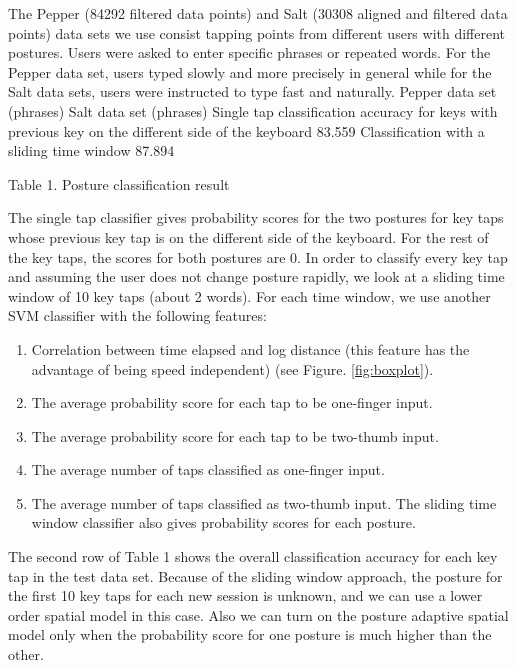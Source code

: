 \documentclass{sigchi}
\begin{document}
The Pepper (84292 filtered data points) and Salt (30308 aligned and filtered data points) data sets we use consist tapping points from different users with different postures. Users were asked to enter specific phrases or repeated words. For the Pepper data set, users typed slowly and more precisely in general while for the Salt data sets, users were instructed to type fast and naturally.
Pepper data set (phrases) Salt data set (phrases)
Single tap classification accuracy for keys with previous key on the different side of the keyboard 83.559%
Classification with a sliding time window 87.894%

Table 1. Posture classification result 

The single tap classifier gives probability scores for the two postures for key taps whose previous key tap is on the different side of the keyboard. For the rest of the key taps, the scores for both postures are 0. In order to classify every key tap and assuming the user does not change posture rapidly, we look at a sliding time window of 10 key taps (about 2 words). For each time window, we use another SVM classifier with the following features:
\begin{enumerate}
\item Correlation between time elapsed and log distance (this feature has the
advantage of being speed independent) (see Figure. \ref{fig:boxplot}).
\item The average probability score for each tap to be one-finger input.
\item The average probability score for each tap to be two-thumb input.
\item The average number of taps classified as one-finger input.
\item The average number of taps classified as two-thumb input.
The sliding time window classifier also gives probability scores for each posture.
\end{enumerate}
The second row of Table 1 shows the overall classification accuracy for each key tap in the test data set. Because of the sliding window approach, the posture for the first 10 key taps for each new session is unknown, and we can use a lower order spatial model in this case. Also we can turn on the posture adaptive spatial model only when the probability score for one posture is much higher than the other. 
\end{document}
